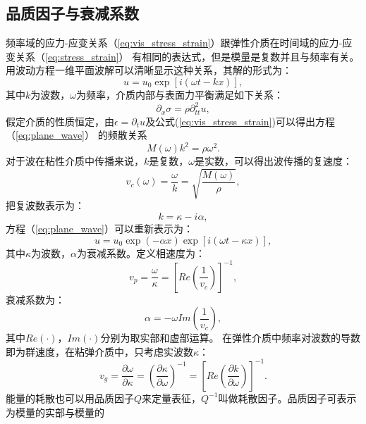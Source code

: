 \subsection{品质因子与衰减系数}
\vspace{0.2cm}
频率域的应力-应变关系（\ref{eq:vis_stress_strain}）跟弹性介质在时间域的应力-应变关系（\ref{eq:stress_strain}）
有相同的表达式，但是模量是复数并且与频率有关。用波动方程一维平面波解可以清晰显示这种关系，其解的形式为：
\begin{equation}
	u=u_0\exp[i(\omega t-kx)],
	\label{eq:plane_wave}
\end{equation}
其中$k$为波数，$\omega$为频率，介质内部与表面力平衡满足如下关系：
\begin{equation}
	\partial_x\sigma=\rho\partial^2_{tt}u,
\end{equation}
假定介质的性质恒定，由$\epsilon=\partial_t u$及公式(\ref{eq:vis_stress_strain})可以得出方程（\ref{eq:plane_wave}）
的频散关系
\begin{equation}
	M(\omega)k^2=\rho\omega^2.
\end{equation}
对于波在粘性介质中传播来说，$k$是复数，$\omega$是实数，可以得出波传播的复速度：
\begin{equation}
	v_c(\omega)=\frac{\omega}{k}=\sqrt{\frac{M(\omega)}{\rho}},
	\label{eq:vc}
\end{equation}
把复波数表示为：
\begin{equation}
	k=\kappa -i\alpha,
\end{equation}
\newpage
方程（\ref{eq:plane_wave}）可以重新表示为：
\begin{equation}
	u=u_0\exp(-\alpha x)\exp[i(\omega t-\kappa x)],
\end{equation}
其中$\kappa$为波数，$\alpha$为衰减系数。定义相速度为：
\begin{equation}
	v_p=\frac{\omega}{\kappa}=[Re(\frac{1}{v_c})]^{-1},
	\label{eq:phase_velocity}
\end{equation}
衰减系数为：
\begin{equation}
	\alpha=-\omega Im(\frac{1}{v_c}),
	\label{eq:alpha}
\end{equation}
其中$Re(\cdot)$，$Im(\cdot)$分别为取实部和虚部运算。
在弹性介质中频率对波数的导数即为群速度，在粘弹介质中，只考虑实波数$\kappa$：
\begin{equation}
	v_g=\frac{\partial \omega}{\partial \kappa}=(\frac{\partial \kappa}{\partial \omega})^{-1}
	=[Re(\frac{\partial k}{\partial \omega})]^{-1}.
\end{equation}
能量的耗散也可以用品质因子$Q$来定量表征，$Q^{-1}$叫做耗散因子。品质因子可表示为模量的实部与模量的
